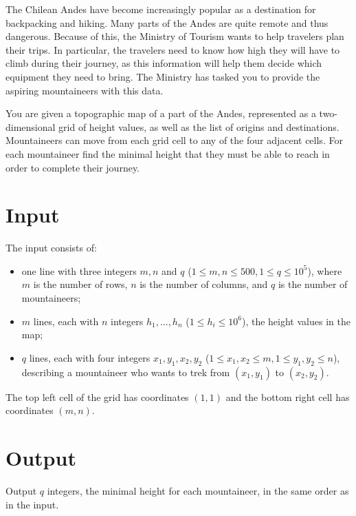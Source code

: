
The Chilean Andes have become increasingly popular as a destination
for backpacking and hiking. Many parts of the Andes are quite remote
and thus dangerous. Because of this, the Ministry of Tourism wants to
help travelers plan their trips. In particular, the travelers need to know how
high they will have to climb during their journey, as this information
will help them decide which equipment they need to bring.
The Ministry has tasked you to provide the aspiring mountaineers with
this data.

You are given a topographic map of a part of the Andes, represented as
a two-dimensional grid of height values, as well as the list of
origins and destinations.
Mountaineers can move from each grid cell to any of the four adjacent
cells.
For each mountaineer find the minimal height
that they must be able to reach in order to complete their journey.

\section*{Input}

The input consists of:
\begin{itemize}
	\item one line with three integers $m, n$ and $q$ ($1 \le m,n \le
    500, 1 \le q \le 10^5$), where $m$ is the number of rows, $n$ is
    the number of columns, and $q$ is the number of mountaineers;
  \item $m$ lines, each with $n$ integers $h_1,\dots,h_n$
    ($1 \le h_i \le 10^6$), the height values in the map;
  \item $q$ lines, each with four integers $x_1,y_1,x_2,y_2$
    ($1 \le x_1,x_2 \le m, 1 \le y_1,y_2 \le n$), describing a
    mountaineer who wants to trek from $(x_1,y_1)$ to $(x_2,y_2)$.
\end{itemize}

The top left cell of the grid has coordinates $(1,1)$ and the bottom
right cell has coordinates $(m,n)$.

\section*{Output}

Output $q$ integers, the minimal height for each mountaineer, in the
same order as in the input.

